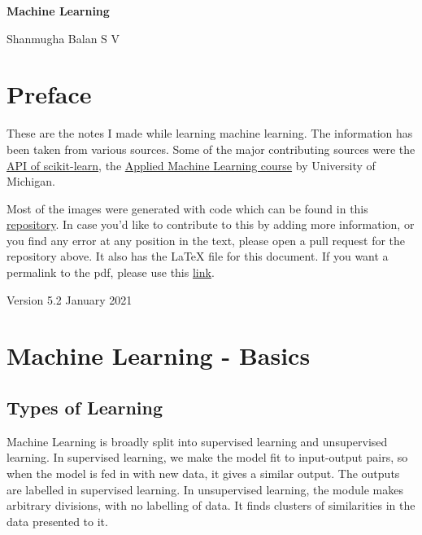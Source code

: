 \documentclass{article}
\begin{document}
\begin{titlepage}
   \begin{center}
   
       \vspace*{7cm}

       \huge{\textbf{Machine Learning}}
          
       \vspace{0.5cm}

       \Large{Shanmugha Balan S V}
       
       \vspace{4.5cm}
       
   \end{center}
\end{titlepage}

\tableofcontents

\section*{Preface}
These are the notes I made while learning machine learning. The information has been taken from various sources. Some of the major contributing sources were the \href{https://scikit-learn.org/stable/modules/classes.html}{API of scikit-learn}, the \href{https://www.coursera.org/learn/python-machine-learning}{Applied Machine Learning course} by University of Michigan.

Most of the images were generated with code which can be found in this \href{https://github.com/sbalan7/ML-and-Stats}{repository}. In case you'd like to contribute to this by adding more information, or you find any error at any position in the text, please open a pull request for the repository above. It also has the LaTeX file for this document. If you want a permalink to the pdf, please use this \href{https://github.com/sbalan7/ML-and-Stats/tree/master/LaTeX Notes/machine_learning.pdf}{link}.

Version 5.2
January 2021

\section{Machine Learning - Basics}

\subsection{Types of Learning}

Machine Learning is broadly split into supervised learning and unsupervised learning. In supervised learning, we make the model fit to input-output pairs, so when the model is fed in with new data, it gives a similar output. The outputs are labelled in supervised learning. In unsupervised learning, the module makes arbitrary divisions, with no labelling of data. It finds clusters of similarities in the data presented to it.
\end{document}
